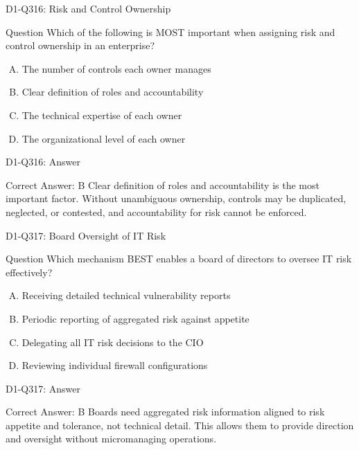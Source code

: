 \documentclass{beamer}
\begin{document}
\begin{frame}{D1-Q316: Risk and Control Ownership}
	\begin{block}{Question}
		Which of the following is MOST important when assigning risk and control ownership in an enterprise?
	\end{block}
	\begin{enumerate}[(A)]
		\item The number of controls each owner manages
		\item Clear definition of roles and accountability
		\item The technical expertise of each owner
		\item The organizational level of each owner
	\end{enumerate}
\end{frame}
\begin{frame}{D1-Q316: Answer}
	\begin{block}{Correct Answer: B}
		Clear definition of roles and accountability is the most important factor. Without unambiguous ownership, controls may be duplicated, neglected, or contested, and accountability for risk cannot be enforced.
	\end{block}
\end{frame}

\begin{frame}{D1-Q317: Board Oversight of IT Risk}
	\begin{block}{Question}
		Which mechanism BEST enables a board of directors to oversee IT risk effectively?
	\end{block}
	\begin{enumerate}[(A)]
		\item Receiving detailed technical vulnerability reports
		\item Periodic reporting of aggregated risk against appetite
		\item Delegating all IT risk decisions to the CIO
		\item Reviewing individual firewall configurations
	\end{enumerate}
\end{frame}
\begin{frame}{D1-Q317: Answer}
	\begin{block}{Correct Answer: B}
		Boards need aggregated risk information aligned to risk appetite and tolerance, not technical detail. This allows them to provide direction and oversight without micromanaging operations.
	\end{block}
\end{frame}
\end{document}
